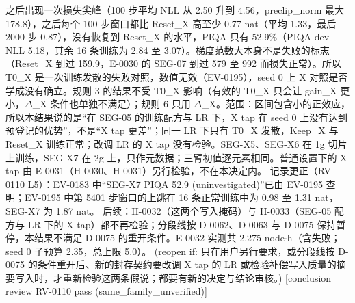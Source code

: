 \documentclass[11pt]{article}
\begin{document}
\begin{itemize}
之后出现一次损失尖峰（100 步平均 NLL 从 2.50 升到 4.56，preclip\_norm 最大 178.8），之后每个 100 步窗口都比 Reset\_X 高至少 0.77 nat（平均 1.33，最后 2000 步 0.87），没有恢复到 Reset\_X 的水平，PIQA 只有 52.9\%（PIQA dev NLL 5.18，其余 16 条训练为 2.84 至 3.07）。梯度范数大本身不是失败的标志（Reset\_X 到过 159.9，E-0030 的 SEG-07 到过 579 至 992 而损失正常）。所以 T0\_X 是一次训练发散的失败对照，数值无效（EV-0195），seed 0 上 X 对照是否学成没有确立。规则 3 的结果不受 T0\_X 影响（有效的 T0\_X 只会让 gain\_X 更小，\ensuremath{\Delta}\_X 条件也单独不满足）；规则 6 只用 \ensuremath{\Delta}\_X。范围：区间包含小的正效应，所以本结果说的是``在 SEG-05 的训练配方与 LR 下，X tap 在 seed 0 上没有达到预登记的优势''，不是``X tap 更差''；同一 LR 下只有 T0\_X 发散，Keep\_X 与 Reset\_X 训练正常；改调 LR 的 X tap 没有检验。SEG-X5、SEG-X6 在 1g 切片上训练，SEG-X7 在 2g 上，只作元数据；三臂初值逐元素相同。普通设置下的 X tap 由 E-0031（H-0030、H-0031）另行检验，不在本决定内。 记录更正（RV-0110 L5）：EV-0183 中``SEG-X7 PIQA 52.9 (uninvestigated)''已由 EV-0195 查明；EV-0195 中第 5401 步窗口的上跳在 16 条正常训练中为 0.98 至 1.31 nat，SEG-X7 为 1.87 nat。 后续：H-0032（这两个写入掩码）与 H-0033（SEG-05 配方与 LR 下的 X tap）都不再检验；分段线按 D-0062、D-0063 与 D-0075 保持暂停，本结果不满足 D-0075 的重开条件。E-0032 实测共 2.275 node\ensuremath{\cdot}h（含失败；seed 0 子预算 2.35，总上限 5.0）。 (reopen if: 只在用户另行要求，或分段线按 D-0075 的条件重开后、新的封存契约要改调 X tap 的 LR 或检验补偿写入质量的摘要写入时，才重新检验这两条假说；都要有新的决定与结论审核。) [conclusion review RV-0110 pass (same\_family\_unverified)]

\end{itemize}
\end{document}
